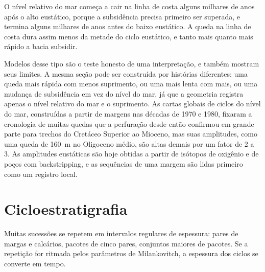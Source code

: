 \begin{omfigure}
\par{}\label{fig:b3:sequence-stratigraphy:section}
\end{omfigure}


O nível relativo do mar começa a cair na linha de costa alguns milhares de anos
após o alto eustático, porque a subsidência precisa primeiro ser superada,
e termina alguns milhares de anos antes do baixo eustático. A queda na
linha de costa dura assim menos da metade do ciclo eustático, e tanto mais quanto
mais rápido a bacia subsidir.

Modelos desse tipo são o teste honesto de uma interpretação, e também mostram
seus limites. A mesma seção pode ser construída por histórias diferentes: uma queda mais rápida
com menos suprimento, ou uma mais lenta com mais, ou uma mudança de subsidência
em vez do nível do mar, já que a geometria registra apenas o nível relativo do mar
e o suprimento. As cartas globais de ciclos do nível do mar, construídas a partir de margens nas
décadas de 1970 e 1980, fixaram a cronologia de muitas quedas que a perfuração desde então
confirmou em grande parte para trechos do Cretáceo Superior ao Mioceno, mas suas
amplitudes, como uma queda de \qty{160}{m} no Oligoceno médio, são altas demais
por um fator de 2 a 3. As amplitudes eustáticas são hoje obtidas a partir de
isótopos de oxigênio e de poços com backstripping, e as sequências de uma margem são
lidas primeiro como um registro local.

\section{Cicloestratigrafia}\label{sec:b3:sequence-stratigraphy:cyclo}

Muitas sucessões se repetem em intervalos regulares de espessura: pares de margas e calcários,
pacotes de cinco pares, conjuntos maiores de pacotes. Se a repetição
for ritmada pelos parâmetros de Milankovitch, a espessura dos
ciclos se converte em tempo.

